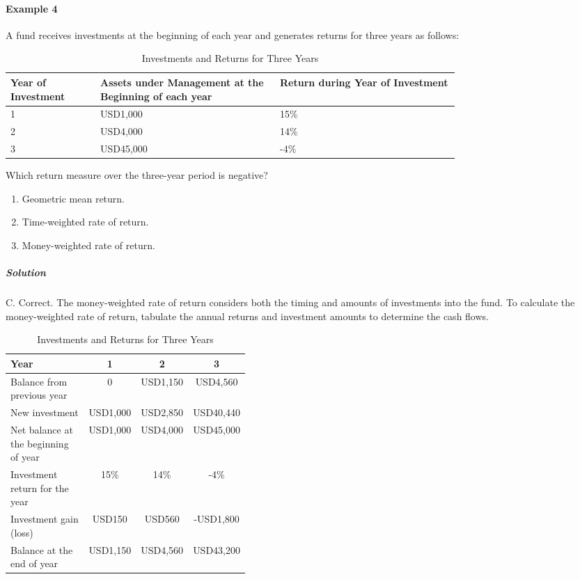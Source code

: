 \paragraph{Example 4} %
A fund receives investments at the beginning of each year and generates returns for three years as follows:
\begin{table}[H]
	\caption{Investments and Returns for Three Years}
	\begin{center}
		\begin{tabular}{p{0.15\linewidth} | p{0.3\linewidth} | p{0.3\linewidth}}
			\toprule
			\textbf{Year of Investment} & \textbf{Assets under Management at the Beginning of each year} & \textbf{Return during Year of Investment}                                            \\
			\midrule
			1             & USD1,000	& 15\%                                                            \\
			2             & USD4,000	& 14\%                                                            \\
			3             & USD45,000	& -4\%                                                           \\
			\bottomrule
		\end{tabular}
	\end{center}
\end{table}
Which return measure over the three-year period is negative?
\begin{enumerate}[label=\Alph*.]
	\item Geometric mean return.
	\item Time-weighted rate of return.
	\item Money-weighted rate of return.
\end{enumerate}
\subparagraph{Solution} %
C. Correct. The money-weighted rate of return considers both the timing and amounts of investments into the fund. To calculate the money-weighted rate of return, tabulate the annual returns and investment amounts to determine the cash flows.
\begin{table}[H]
	\caption{Investments and Returns for Three Years}
	\begin{center}
		\begin{tabular}{p{0.4\linewidth} c c c }
			\toprule
			\textbf{Year} & 1	& 2	& 3 \\
			\midrule
			Balance from previous year & 0	& USD1,150	& USD4,560 \\
			New investment & USD1,000	& USD2,850	& USD40,440 \\
			Net balance at the beginning of year & USD1,000	& USD4,000	& USD45,000 \\
			Investment return for the year & 15\%	& 14\%	& -4\% \\
			Investment gain (loss) & USD150	& USD560	& -USD1,800 \\
			Balance at the end of year & USD1,150	& USD4,560	& USD43,200 \\
			\bottomrule
		\end{tabular}
	\end{center}
\end{table}
